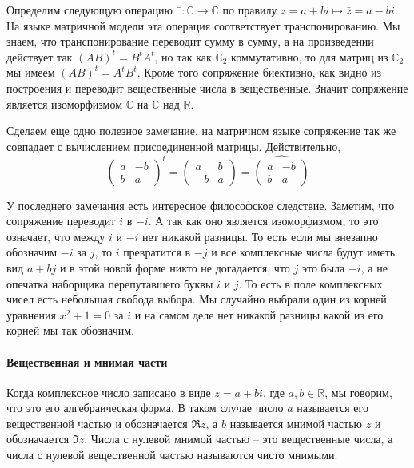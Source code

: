Определим следующую операцию $\bar{\phantom{z}}\colon \mathbb C\to \mathbb C$ по правилу $z = a + bi \mapsto \bar z = a - bi$.
На языке матричной модели эта операция соответствует транспонированию.
Мы знаем, что транспонирование переводит сумму в сумму, а на произведении действует так $(AB)^t = B^t A^t$, но так как $\mathbb C_2$ коммутативно, то для матриц из $\mathbb C_2$ мы имеем $(AB)^t = A^t B^t$.
Кроме того сопряжение биективно, как видно из построения и переводит вещественные числа в вещественные.
Значит сопряжение является изоморфизмом $\mathbb C$ на $\mathbb C$ над $\mathbb R$.

Сделаем еще одно полезное замечание, на матричном языке сопряжение так же совпадает с вычислением присоединенной матрицы.
Действительно,
\[
\begin{pmatrix}
{a}&{-b}\\
{b}&{a}
\end{pmatrix}^t
= 
\begin{pmatrix}
{a}&{b}\\
{-b}&{a}
\end{pmatrix}
=
\widehat{
\begin{pmatrix}
{a}&{-b}\\
{b}&{a}
\end{pmatrix}}
\]

У последнего замечания есть интересное философское следствие.
Заметим, что сопряжение переводит $i$ в $-i$.
А так как оно является изоморфизмом, то это означает, что между $i$ и $-i$ нет никакой разницы.
То есть если мы внезапно обозначим $-i$ за $j$, то $i$ превратится в $-j$ и все комплексные числа будут иметь вид $a + bj$ и в этой новой форме никто не догадается, что $j$ это была $-i$, а не опечатка наборщика перепутавшего буквы $i$ и $j$.
То есть в поле комплексных чисел есть небольшая свобода выбора.
Мы случайно выбрали один из корней уравнения $x^2 + 1 = 0$ за $i$ и на самом деле нет никакой разницы какой из его корней мы так обозначим.

\paragraph{Вещественная и мнимая части}

Когда комплексное число записано в виде $z = a + bi$, где $a,b\in\mathbb R$, мы говорим, что это его алгебраическая форма.
В таком случае число $a$ называется его вещественной частью и обозначается $\Re z$, а $b$ называется мнимой частью $z$ и обозначается $\Im z$.
Числа с нулевой мнимой частью -- это вещественные числа, а числа с нулевой вещественной частью называются чисто мнимыми.

